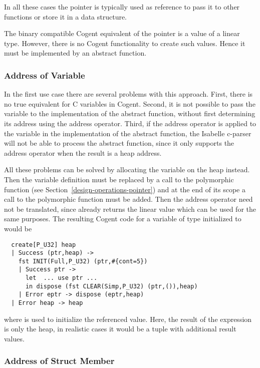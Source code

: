 In all these cases the pointer is typically used as reference to pass it to other functions or store it
in a data structure.

The binary compatible Cogent equivalent of the pointer is a value of a linear type. However, there is
no Cogent functionality to create such values. Hence it must be implemented by an abstract function.

\subsubsection{Address of Variable}

In the first use case there are several problems with this approach. First, there is no true equivalent
for C variables in Cogent. Second, it is not possible to pass the variable to the implementation of the
abstract function, without first determining its address using the address operator. Third, if the address
operator is applied to the variable in the implementation of the abstract function, the Isabelle c-parser
will not be able to process the abstract function, since it only supports the address operator when 
the result is a heap address.

All these problems can be solved by allocating the variable on the heap instead. Then the variable definition
must be replaced by a call to the polymorphic function  (see Section~\ref{design-operations-pointer}) and 
at the end of its scope a call to the polymorphic function  must be added. Then the address
operator need not be translated, since  already returns the linear value which can be 
used for the same purposes. The resulting Cogent code for a variable of type  initialized to 
would be
\begin{verbatim}
  create[P_U32] heap
  | Success (ptr,heap) ->
    fst INIT(Full,P_U32) (ptr,#{cont=5})
    | Success ptr ->
      let  ... use ptr ...
      in dispose (fst CLEAR(Simp,P_U32) (ptr,()),heap)
    | Error eptr -> dispose (eptr,heap)
  | Error heap -> heap
\end{verbatim}
where  is used to initialize the referenced value. Here, the result of the expression is
only the heap, in realistic cases it would be a tuple with additional result values.

\subsubsection{Address of Struct Member}

